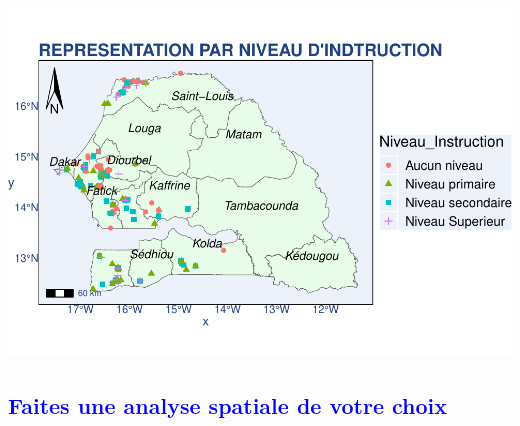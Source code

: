 \documentclass[
]{article}
\begin{document}
\includegraphics{PROJET_files/figure-latex/unnamed-chunk-24-1.pdf}

\newpage

\textcolor{blue}{\subsection{ Faites une analyse spatiale de votre choix}}
\end{document}

